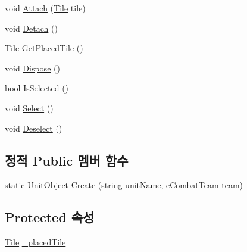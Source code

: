 \begin{DoxyCompactItemize}
\item 
void \hyperlink{class_place_object_aa0f1a877d0abc20133e390d0964602ed}{Attach} (\hyperlink{class_tile}{Tile} tile)
\item 
void \hyperlink{class_place_object_a5bcf3ff3fd935121fbd699a08da217e2}{Detach} ()
\item 
\hyperlink{class_tile}{Tile} \hyperlink{class_place_object_a55363002bd68063cf079185a5729b76c}{Get\+Placed\+Tile} ()
\item 
void \hyperlink{class_place_object_aeac9db9685cc3134a90b6a2578046933}{Dispose} ()
\item 
bool \hyperlink{class_place_object_a55fd3f2bd6cccd98390c675371ab723e}{Is\+Selected} ()
\item 
void \hyperlink{class_place_object_a76b1b569fa2aa204ee8e2cb6a350694d}{Select} ()
\item 
void \hyperlink{class_place_object_ad54985fa9ccaf2df149af83b4f17892e}{Deselect} ()
\end{DoxyCompactItemize}
\subsection*{정적 Public 멤버 함수}
\begin{DoxyCompactItemize}
\item 
static \hyperlink{class_unit_object}{Unit\+Object} \hyperlink{class_unit_object_ae5ef094dc79c767cc91aad73134dd227}{Create} (string unit\+Name, \hyperlink{_unit_object_8cs_a833537ff3bed216464ac08315287fb12}{e\+Combat\+Team} team)
\end{DoxyCompactItemize}
\subsection*{Protected 속성}
\begin{DoxyCompactItemize}
\item 
\hyperlink{class_tile}{Tile} \hyperlink{class_place_object_a2006d9f7ffcf8aba6f731ebfc9b0af35}{\+\_\+placed\+Tile}
\end{DoxyCompactItemize}
